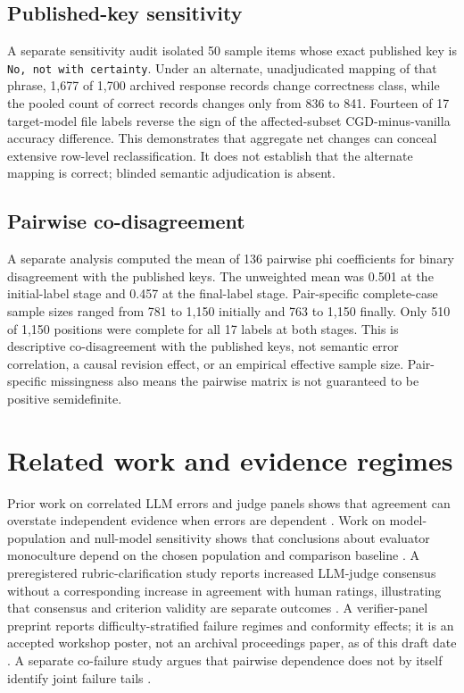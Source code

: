 \documentclass[11pt]{article}
\begin{document}
\subsection{Published-key sensitivity}
A separate sensitivity audit isolated 50 sample items whose exact published key is \texttt{No, not with certainty}. Under an alternate, unadjudicated mapping of that phrase, 1,677 of 1,700 archived response records change correctness class, while the pooled count of correct records changes only from 836 to 841. Fourteen of 17 target-model file labels reverse the sign of the affected-subset CGD-minus-vanilla accuracy difference. This demonstrates that aggregate net changes can conceal extensive row-level reclassification. It does not establish that the alternate mapping is correct; blinded semantic adjudication is absent.

\subsection{Pairwise co-disagreement}
A separate analysis computed the mean of 136 pairwise phi coefficients for binary disagreement with the published keys. The unweighted mean was 0.501 at the initial-label stage and 0.457 at the final-label stage. Pair-specific complete-case sample sizes ranged from 781 to 1,150 initially and 763 to 1,150 finally. Only 510 of 1,150 positions were complete for all 17 labels at both stages. This is descriptive co-disagreement with the published keys, not semantic error correlation, a causal revision effect, or an empirical effective sample size. Pair-specific missingness also means the pairwise matrix is not guaranteed to be positive semidefinite.

\section{Related work and evidence regimes}
Prior work on correlated LLM errors and judge panels shows that agreement can overstate independent evidence when errors are dependent \cite{Kim2025,Hossain2026,Kohli2026}. Work on model-population and null-model sensitivity shows that conclusions about evaluator monoculture depend on the chosen population and comparison baseline \cite{Jo2026}. A preregistered rubric-clarification study reports increased LLM-judge consensus without a corresponding increase in agreement with human ratings, illustrating that consensus and criterion validity are separate outcomes \cite{Han2026}. A verifier-panel preprint reports difficulty-stratified failure regimes and conformity effects; it is an accepted workshop poster, not an archival proceedings paper, as of this draft date \cite{Chernets2026}. A separate co-failure study argues that pairwise dependence does not by itself identify joint failure tails \cite{Chen2026}.
\end{document}
